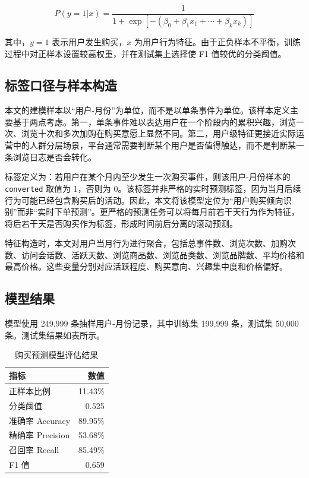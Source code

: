 \documentclass[12pt,hyperref,a4paper,UTF8]{ctexart}
\begin{document}
\[
P(y=1|x)=\frac{1}{1+\exp[-(\beta_0+\beta_1x_1+\cdots+\beta_kx_k)]}
\]

其中，\(y=1\) 表示用户发生购买，\(x\) 为用户行为特征。由于正负样本不平衡，训练过程中对正样本设置较高权重，并在测试集上选择使 F1 值较优的分类阈值。

\subsection{标签口径与样本构造}

本文的建模样本以“用户-月份”为单位，而不是以单条事件为单位。该样本定义主要基于两点考虑。第一，单条事件难以表达用户在一个阶段内的累积兴趣，浏览一次、浏览十次和多次加购在购买意愿上显然不同。第二，用户级特征更接近实际运营中的人群分层场景，平台通常需要判断某个用户是否值得触达，而不是判断某一条浏览日志是否会转化。

标签定义为：若用户在某个月内至少发生一次购买事件，则该用户-月份样本的 \texttt{converted} 取值为 1，否则为 0。该标签并非严格的实时预测标签，因为当月后续行为可能已经包含购买后的活动。因此，本文将该模型定位为“用户购买倾向识别”而非“实时下单预测”。更严格的预测任务可以将每月前若干天行为作为特征，将后若干天是否购买作为标签，形成时间前后分离的滚动预测。

特征构造时，本文对用户当月行为进行聚合，包括总事件数、浏览次数、加购次数、访问会话数、活跃天数、浏览商品数、浏览品类数、浏览品牌数、平均价格和最高价格。这些变量分别对应活跃程度、购买意向、兴趣集中度和价格偏好。

\subsection{模型结果}

模型使用 249,999 条抽样用户-月份记录，其中训练集 199,999 条，测试集 50,000 条。测试集结果如表所示。

\begin{table}[H]
\centering
\caption{购买预测模型评估结果}
\begin{tabular}{lr}
\toprule
指标 & 数值 \\
\midrule
正样本比例 & 11.43\% \\
分类阈值 & 0.525 \\
准确率 Accuracy & 89.95\% \\
精确率 Precision & 53.68\% \\
召回率 Recall & 85.49\% \\
F1 值 & 0.659 \\
\bottomrule
\end{tabular}
\end{table}
\end{document}

